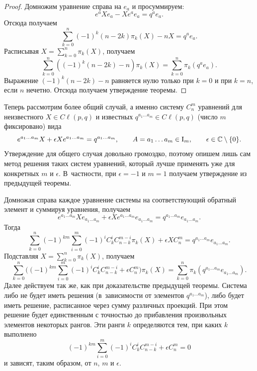 \smallskip

\begin{proof} Домножим уравнение справа на $e_a$ и просуммируем: 
$$e^{a} X e_{a}-X e^{a} e_{a}=q^{a} e_{a}.$$
Отсюда получаем
$$\sum_{k=0}^{n}(-1)^{k}(n-2k)\pi_k(X)- n X=q^{a} e_{a}.$$
Расписывая $X=\sum_{k=0}^n \pi_k(X)$, получаем
$$\sum_{k=0}^{n}((-1)^{k}(n-2k)-n)\pi_k(X)=\sum_{k=0}^n \pi_k(q^{a} e_{a}).$$
Выражение $(-1)^{k}(n-2k)-n$ равняется нулю только при $k=0$ и при $k=n$, если $n$ нечетно. 
Отсюда получаем утверждение теоремы.
\end{proof}

\smallskip

Теперь рассмотрим более общий случай, а именно систему $C_n^m$ уравнений для неизвестного $X\in{{C}\!\ell}(p,q)$ и известных $q^{a_1 \ldots a_m}\in{{C}\!\ell}(p,q)$ (число $m$ фиксировано) вида
\begin{equation}
e^{a_1 \ldots a_m} X+\epsilon X e^{a_1 \ldots a_m}=q^{a_1 \ldots a_m},\qquad A={a_1 \ldots a_m}\in {\rm I}_ m,\qquad \epsilon\in{\Bbb C}\setminus\{0\}.
\end{equation}
Утверждение для общего случая довольно громоздко, поэтому опишем лишь сам метод решения таких систем уравнений, который лучше применять уже для конкретных $m$ и $\epsilon$. 
В~частности, при $\epsilon=-1$ и $m=1$ получаем утверждение из предыдущей теоремы.

Домножая справа каждое уравнение системы на соответствующий обратный элемент и суммируя уравнения, получаем
$$e^{a_1 \ldots a_m} X e_{a_1 \ldots a_m}+\epsilon X e^{a_1 \ldots a_m} e_{a_1 \ldots a_m}=q^{a_1 \ldots a_m} e_{a_1 \ldots a_m}.$$
Тогда
$$\sum_{k=0}^{n}(-1)^{km}\sum_{i=0}^m (-1)^i C_k^i C_{n-k}^{m-i}\pi_k(X)+\epsilon X C_n^m=q^{a_1 \ldots a_m} e_{a_1 \ldots a_m}.$$
Подставляя $X=\sum_{k=0}^n\pi_k(X)$, получаем
$$\sum_{k=0}^{n}\biggl((-1)^{km}\sum_{i=0}^m (-1)^i C_k^i C_{n-k}^{m-i}+\epsilon C_n^m\biggr)\pi_k(X)=\sum_{k=0}^n \pi_k(q^{a_1 \ldots a_m} e_{a_1 \ldots a_m}).$$
Далее действуем так же, как при доказательстве предыдущей теоремы. Система либо не будет  иметь решения (в~зависимости от элементов $q^{a_1 \ldots a_m}$), либо будет иметь решение, расписанное через сумму различных проекций. При этом решение будет единственным с точностью до прибавления произвольных элементов некоторых рангов. Эти ранги $k$ определяются тем, при каких $k$ выполнено 
$$(-1)^{km}\sum_{i=0}^m (-1)^i C_k^i C_{n-k}^{m-i}+\epsilon C_n^m=0$$ и зависят, таким образом, от $n$, $m$ и $\epsilon$.

\smallskip


